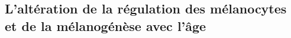 










\subsection{L'altération de la régulation des mélanocytes et de la mélanogénèse avec l'âge}

